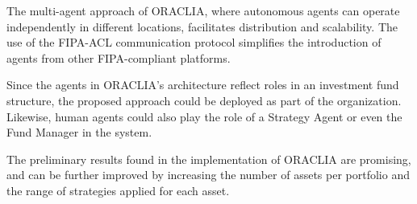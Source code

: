 \documentclass{aamas2017-extabs}
\begin{document}
The multi-agent approach of ORACLIA, where autonomous agents can operate independently in different locations, facilitates distribution and scalability. The use of the FIPA-ACL communication protocol simplifies the introduction of agents from other FIPA-compliant platforms.

Since the agents in ORACLIA's architecture reflect roles in an investment fund structure, the proposed approach could be deployed as part of the organization. Likewise, human agents could also play the role of a Strategy Agent or even the Fund Manager in the system.

The preliminary results found in the implementation of ORACLIA are promising, and can be further improved by increasing the number of assets per portfolio and the range of strategies applied for each asset.


 
\end{document}
